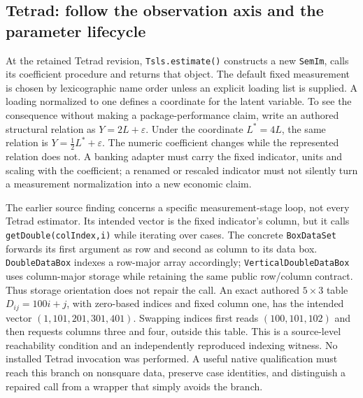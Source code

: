\subsection{Tetrad: follow the observation axis and the parameter lifecycle}

At the retained Tetrad revision, \texttt{Tsls.estimate()} constructs a new \texttt{SemIm}, calls its coefficient procedure and returns that object. The default fixed measurement is chosen by lexicographic name order unless an explicit loading list is supplied. A loading normalized to one defines a coordinate for the latent variable. To see the consequence without making a package-performance claim, write an authored structural relation as $Y=2L+\varepsilon$. Under the coordinate $L^*=4L$, the same relation is $Y=\tfrac12 L^*+\varepsilon$. The numeric coefficient changes while the represented relation does not. A banking adapter must carry the fixed indicator, units and scaling with the coefficient; a renamed or rescaled indicator must not silently turn a measurement normalization into a new economic claim.~\citep{exec22_java_latent_iv_preflight,exec25_javaiv_tetrad,exec25_javaiv_choice}

The earlier source finding concerns a specific measurement-stage loop, not every Tetrad estimator. Its intended vector is the fixed indicator's column, but it calls \texttt{getDouble(colIndex,i)} while iterating over cases. The concrete \texttt{BoxDataSet} forwards its first argument as row and second as column to its data box. \texttt{DoubleDataBox} indexes a row-major array accordingly; \texttt{VerticalDoubleDataBox} uses column-major storage while retaining the same public row/column contract. Thus storage orientation does not repair the call. An exact authored $5\times3$ table $D_{ij}=100i+j$, with zero-based indices and fixed column one, has the intended vector $(1,101,201,301,401)$. Swapping indices first reads $(100,101,102)$ and then requests columns three and four, outside this table. This is a source-level reachability condition and an independently reproduced indexing witness. No installed Tetrad invocation was performed. A useful native qualification must reach this branch on nonsquare data, preserve case identities, and distinguish a repaired call from a wrapper that simply avoids the branch.~\citep{exec25_javaiv_tetrad,exec25_javaiv_choice}

